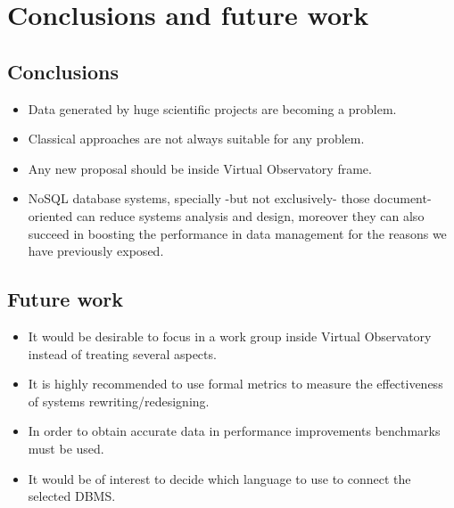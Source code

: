 \chapter{Conclusions and future work}


\section{Conclusions}

\begin{itemize}

\item Data generated by huge scientific projects are becoming a problem.

\item Classical approaches are not always suitable for any problem.

\item Any new proposal should be inside Virtual Observatory frame.

\item NoSQL database systems, specially -but not exclusively- those document-oriented can reduce systems analysis and design, moreover they can also succeed in boosting the performance in data management for the reasons we have previously exposed.

\end{itemize}

\section{Future work}

\begin{itemize}

\item It would be desirable to focus in a work group inside Virtual Observatory instead of treating several aspects.

\item It is highly recommended to use formal metrics to measure the effectiveness of systems rewriting/redesigning.

\item In order to obtain accurate data in performance improvements benchmarks must be used.

\item It would be of interest to decide which language to use to connect the selected DBMS.

\end{itemize}

